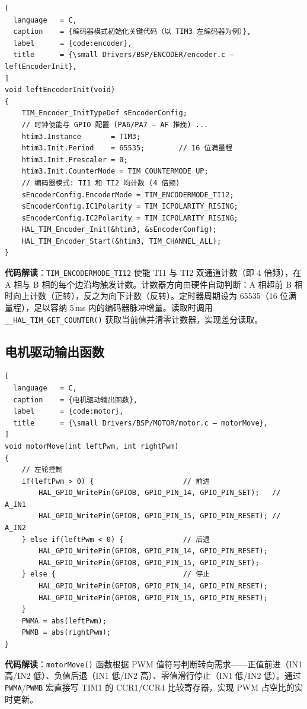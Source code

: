 \documentclass[12pt,a4paper,UTF8]{ctexrep}
\begin{document}
\begin{lstlisting}[
  language   = C,
  caption    = {编码器模式初始化关键代码（以 TIM3 左编码器为例）},
  label      = {code:encoder},
  title      = {\small Drivers/BSP/ENCODER/encoder.c — leftEncoderInit},
]
void leftEncoderInit(void)
{
    TIM_Encoder_InitTypeDef sEncoderConfig;
    // 时钟使能与 GPIO 配置 (PA6/PA7 — AF 推挽) ...
    htim3.Instance       = TIM3;
    htim3.Init.Period    = 65535;        // 16 位满量程
    htim3.Init.Prescaler = 0;
    htim3.Init.CounterMode = TIM_COUNTERMODE_UP;
    // 编码器模式: TI1 和 TI2 均计数 (4 倍频)
    sEncoderConfig.EncoderMode = TIM_ENCODERMODE_TI12;
    sEncoderConfig.IC1Polarity = TIM_ICPOLARITY_RISING;
    sEncoderConfig.IC2Polarity = TIM_ICPOLARITY_RISING;
    HAL_TIM_Encoder_Init(&htim3, &sEncoderConfig);
    HAL_TIM_Encoder_Start(&htim3, TIM_CHANNEL_ALL);
}
\end{lstlisting}

\textbf{代码解读}：\texttt{TIM\_ENCODERMODE\_TI12} 使能 TI1 与 TI2 双通道计数（即 4 倍频），在 A 相与 B 相的每个边沿均触发计数。计数器方向由硬件自动判断：A 相超前 B 相时向上计数（正转），反之为向下计数（反转）。定时器周期设为 65535（16 位满量程），足以容纳 5\,ms 内的编码器脉冲增量。读取时调用 \texttt{\_\_HAL\_TIM\_GET\_COUNTER()} 获取当前值并清零计数器，实现差分读取。

\subsection{电机驱动输出函数}

\begin{lstlisting}[
  language   = C,
  caption    = {电机驱动输出函数},
  label      = {code:motor},
  title      = {\small Drivers/BSP/MOTOR/motor.c — motorMove},
]
void motorMove(int leftPwm, int rightPwm)
{
    // 左轮控制
    if(leftPwm > 0) {                     // 前进
        HAL_GPIO_WritePin(GPIOB, GPIO_PIN_14, GPIO_PIN_SET);   // A_IN1
        HAL_GPIO_WritePin(GPIOB, GPIO_PIN_15, GPIO_PIN_RESET); // A_IN2
    } else if(leftPwm < 0) {              // 后退
        HAL_GPIO_WritePin(GPIOB, GPIO_PIN_14, GPIO_PIN_RESET);
        HAL_GPIO_WritePin(GPIOB, GPIO_PIN_15, GPIO_PIN_SET);
    } else {                              // 停止
        HAL_GPIO_WritePin(GPIOB, GPIO_PIN_14, GPIO_PIN_RESET);
        HAL_GPIO_WritePin(GPIOB, GPIO_PIN_15, GPIO_PIN_RESET);
    }
    PWMA = abs(leftPwm);
    PWMB = abs(rightPwm);
}
\end{lstlisting}

\textbf{代码解读}：\texttt{motorMove()} 函数根据 PWM 值符号判断转向需求——正值前进（IN1 高/IN2 低）、负值后退（IN1 低/IN2 高）、零值滑行停止（IN1 低/IN2 低）。通过 \texttt{PWMA}/\texttt{PWMB} 宏直接写 TIM1 的 CCR1/CCR4 比较寄存器，实现 PWM 占空比的实时更新。
\end{document}
